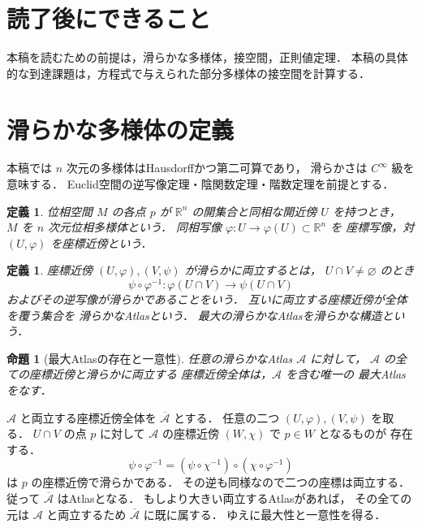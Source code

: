 \documentclass[a5paper,10pt,onecolumn]{jsarticle}
\makeatletter
\theoremstyle{mathnotetheorem}
\newtheorem{definition}[theorem]{定義}
\newtheorem{proposition}[theorem]{命題}
\renewcommand{\proofname}{証明}
\renewenvironment{proof}[1][\proofname]{%
  \par\pushQED{\qed}\normalfont\topsep4\p@\@plus2\p@\relax
  \trivlist\item[\hskip\labelsep\bfseries #1]\ignorespaces
}{\popQED\endtrivlist\@endpefalse}
\makeatother
\begin{document}
\section*{読了後にできること}
本稿を読むための前提は，滑らかな多様体，接空間，正則値定理．
本稿の具体的な到達課題は，方程式で与えられた部分多様体の接空間を計算する．

\section{滑らかな多様体の定義}

本稿では $n$ 次元の多様体はHausdorffかつ第二可算であり，
滑らかさは $C^\infty$ 級を意味する．
Euclid空間の逆写像定理・陰関数定理・階数定理を前提とする．

\begin{definition}
位相空間 $M$ の各点 $p$ が
$\mathbb R^n$ の開集合と同相な開近傍 $U$ を持つとき，
$M$ を $n$ 次元\emph{位相多様体}という．
同相写像 $\varphi:U\to\varphi(U)\subset\mathbb R^n$ を
\emph{座標写像}，対 $(U,\varphi)$ を座標近傍という．
\end{definition}

\begin{definition}
座標近傍 $(U,\varphi),(V,\psi)$ が滑らかに両立するとは，
$U\cap V\ne\varnothing$ のとき
\[
 \psi\circ\varphi^{-1}:
 \varphi(U\cap V)\longrightarrow\psi(U\cap V)
\]
およびその逆写像が滑らかであることをいう．
互いに両立する座標近傍が全体を覆う集合を
\emph{滑らかなAtlas}という．
最大の滑らかなAtlasを滑らかな構造という．
\end{definition}

\begin{proposition}[最大Atlasの存在と一意性]
\label{prop:maxatlas}
任意の滑らかなAtlas $\mathcal A$ に対して，
$\mathcal A$ の全ての座標近傍と滑らかに両立する
座標近傍全体は，$\mathcal A$ を含む唯一の
最大Atlasをなす．
\end{proposition}
\begin{proof}
$\mathcal A$ と両立する座標近傍全体を
$\overline{\mathcal A}$ とする．
任意の二つ $(U,\varphi),(V,\psi)$ を取る．
$U\cap V$ の点 $p$ に対して
$\mathcal A$ の座標近傍 $(W,\chi)$ で $p\in W$ となるものが
存在する．
\[
 \psi\circ\varphi^{-1}
 =(\psi\circ\chi^{-1})\circ(\chi\circ\varphi^{-1})
\]
は $p$ の座標近傍で滑らかである．
その逆も同様なので二つの座標は両立する．
従って $\overline{\mathcal A}$ はAtlasとなる．
もしより大きい両立するAtlasがあれば，
その全ての元は $\mathcal A$ と両立するため
$\overline{\mathcal A}$ に既に属する．
ゆえに最大性と一意性を得る．
\end{proof}
\end{document}

